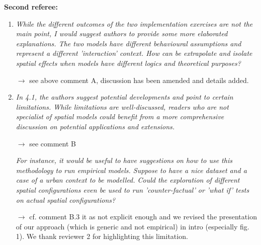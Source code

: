 \documentclass[11pt,a4paper,sans]{moderncv}        %
\begin{document}
\textbf{Second referee:}
 


\medskip


\begin{enumerate}

  \item \textit{While the different outcomes of the two implementation exercises are not the main point, I would suggest authors to provide some more elaborated explanations. The two models have different behavioural assumptions and represent a different 'interaction' context. How can be extrapolate and isolate spatial effects when models have different logics and theoretical purposes?}
  
  $\rightarrow$ see above comment A, discussion has been amended and details added.
  \medskip

  \item \textit{In 4.1, the authors suggest potential developments and point to certain limitations. While limitations are well-discussed, readers who are not specialist of spatial models could benefit from a more comprehensive discussion on potential applications and extensions.}
  
  $\rightarrow$ see comment B
  
  \medskip
  
  \textit{For instance, it would be useful to have suggestions on how to use this methodology to run empirical models. Suppose to have a nice dataset and a case of a urban context to be modelled. Could the exploration of different spatial configurations even be used to run 'counter-factual' or 'what if' tests on actual spatial configurations?}
  
  $\rightarrow$ cf. comment B.3
  it as not explicit enough and we revised the presentation of our approach (which is generic and not empirical) in intro (especially fig. 1). We thank reviewer 2 for highlighting this limitation.


\end{enumerate}
\end{document}
